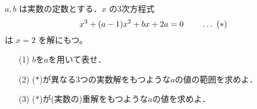 \documentclass[8pt,dvipdfmx]{article}
\begin{document}
\begin{tcolorbox}[title=数学\textcircled{1} 3- 4 AB]
\(a,b\) は実数の定数とする．\(x\) の3次方程式
\[
x^3 + (a-1)x^2 + bx + 2a = 0\tag*{\dotso($*$)}\\ 
\]
は \(x=2\) を解にもつ。
\begin{enumerate}
    \item[(1)] $b$を$a$を用いて表せ．
    \vspace{2mm}
    \item[(2)]({$*$})が異なる3つの実数解をもつような$a$の値の範囲を求めよ．
    \vspace{2mm}
    \item[(3)]({$*$})が(実数の)重解をもつような$a$の値を求めよ．
\end{enumerate}
\end{tcolorbox}
\end{document}
